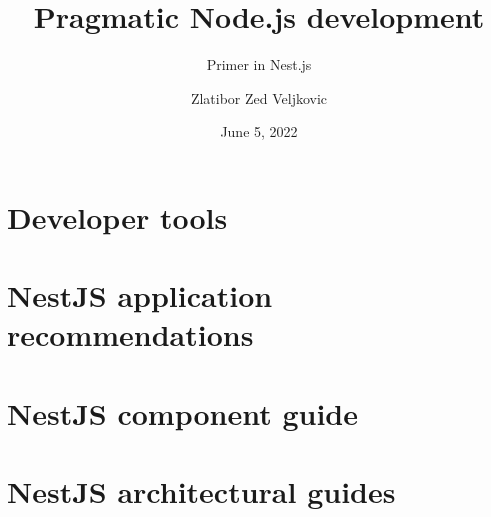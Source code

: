 \documentclass[lang=en,color=green]{elegantbook}
\title{Pragmatic Node.js development}
\subtitle{Primer in Nest.js}
\author{Zlatibor Zed Veljkovic}
\date{June 5, 2022}
\begin{document}
    \maketitle
    \frontmatter

    \tableofcontents

    \mainmatter


    \chapter{Developer tools}\label{ch:developer-tools}
    


    \chapter{NestJS application recommendations}\label{ch:nestjs-application-recommendations}
    

    \chapter{NestJS component guide}\label{ch:nestjs-component-guides}
    

    \chapter{NestJS architectural guides}\label{ch:nestjs-architectural-guides}
    
\end{document}
